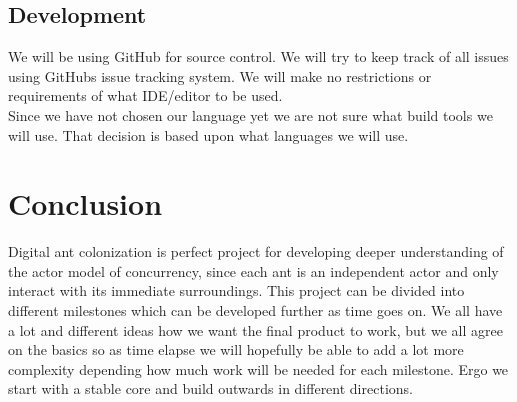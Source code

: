 \documentclass[a4paper]{article}
\begin{document}
\subsection{Development}
We will be using GitHub for source control. We will try to keep track of all
issues using GitHubs issue tracking system. We will make no restrictions or
requirements of what IDE/editor to be used.\\
Since we have not chosen our language yet we are not sure what build tools we
will use. That decision is based upon what languages we will use.



\section{Conclusion}
Digital ant colonization is perfect project for developing deeper understanding
of the actor model of concurrency, since each ant is an independent actor and
only interact with its immediate surroundings. This project can be divided into
different milestones which can be developed further as time goes on. We all have
a lot and different ideas how we want the final product to work, but we all agree
on the basics so as time elapse we will hopefully be able to add a lot more
complexity depending how much work will be needed for each milestone. Ergo we
start with a stable core and build outwards in different directions.
\end{document}
